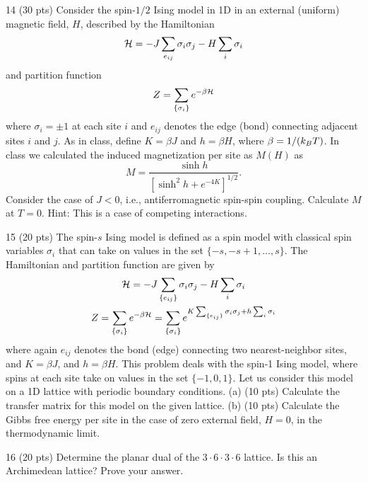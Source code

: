 \begin{hwproblem}{1}{4}
(30 pts) Consider the spin-$1/2$ Ising model in 1D in an external (uniform) magnetic field, $H$, described by the
Hamiltonian
\begin{equation}
  \mathcal{H} = -J\sum_{e_{ij}}\sigma_i\sigma_j - H\sum_i\sigma_i
\end{equation}
and partition function
\begin{equation}
  Z = \sum_{\{\sigma_i\}}e^{-\beta\mathcal{H}}
\end{equation}
where $\sigma_i = \pm1$ at each site $i$ and $e_{ij}$ denotes the edge (bond) connecting adjacent sites $i$ and $j$.
As in class, define $K = \beta J$ and $h = \beta H$, where $\beta = 1/(k_{B} T)$. In class we calculated the induced
magnetization per site as $M(H)$ as
\begin{equation}
  M = \frac{\sinh h}{\left[\sinh^2h+e^{-4K}\right]^{1/2}}.
\end{equation}
Consider the case of $J<0$, i.e., antiferromagnetic spin-spin coupling. Calculate $M$ at $T = 0$. Hint: This is a
case of competing interactions.
\end{hwproblem}

\begin{hwproblem}{1}{5}
(20 pts) The spin-$s$ Ising model is defined as a spin model with classical spin variables $\sigma_i$ that can take on
values in the set $\{-s,-s+1,\ldots,s\}$. The Hamiltonian and partition function are given by
\begin{gather}
  \mathcal{H} = -J\sum_{\{e_{ij}\}}\sigma_i\sigma_j - H\sum_i\sigma_i\\
  Z = \sum_{\{\sigma_i\}}e^{-\beta\mathcal{H}} = \sum_{\{\sigma_i\}}e^{K\sum_{\{e_{ij}\}}\sigma_i\sigma_j+h\sum_i\sigma_i}
\end{gather}
where again $e_{ij}$ denotes the bond (edge) connecting two nearest-neighbor sites, and $K = \beta J$, and $h = \beta H$.
This problem deals with the spin-1 Ising model, where spins at each site take on values in the set $\{-1,0,1\}$. Let us
consider this model on a 1D lattice with periodic boundary conditions. (a) (10 pts) Calculate the transfer matrix for
this model on the given lattice. (b) (10 pts) Calculate the Gibbs free energy per site in the case of zero external
field, $H = 0$, in the thermodynamic limit.
\end{hwproblem}

\begin{hwproblem}{1}{6}
(20 pts) Determine the planar dual of the $3\cdot 6\cdot 3\cdot 6$ lattice. Is this an Archimedean lattice? Prove
your answer.
\end{hwproblem}
